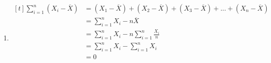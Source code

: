 \documentclass{article}
\begin{document}
\begin{enumerate}
    \item
    $\begin{aligned}[t]
    \sum_{i=1}^{n}(X_i-\overline{X})&=(X_1-\overline{X})+(X_2-\overline{X})+(X_3-\overline{X})+...+(X_n-\overline{X})\\
    &=\sum_{i=1}^{n}X_i-n\overline{X}\\
    &=\sum_{i=1}^{n}X_i-n\sum_{i=1}^{n}\frac{X_i}{n}\\
    &=\sum_{i=1}^{n}X_i-\sum_{i=1}^{n}X_i\\
    &=0\\
    \ \\
    \ \\
    \ \\
    \ \\
    \end{aligned}$
    

\end{enumerate}
\end{document}
